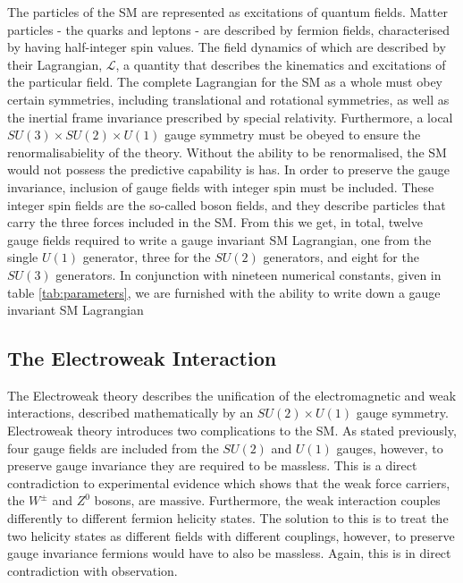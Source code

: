 The particles of the SM are represented as excitations of quantum fields.
Matter particles - the quarks and leptons - are described by fermion fields, characterised by having half-integer spin values.
The field dynamics of which are described by their Lagrangian, $\mathcal{L}$, a quantity that describes the kinematics and excitations of the particular field. 
The complete Lagrangian for the SM as a whole must obey certain symmetries, including translational and rotational symmetries, as well as the inertial frame invariance prescribed by special relativity.
Furthermore, a local $SU(3) \times SU(2) \times U(1)$ gauge symmetry must be obeyed to ensure the renormalisabielity of the theory. 
Without the ability to be renormalised, the SM would not possess the predictive capability is has.
In order to preserve the gauge invariance, inclusion of gauge fields with integer spin must be included.
These integer spin fields are the so-called boson fields, and they describe particles that carry the three forces included in the SM.
From this we get, in total, twelve gauge fields required to write a gauge invariant SM Lagrangian, one from the single $U(1)$ generator, three for the $SU(2)$ generators, and eight for the $SU(3)$ generators.
In conjunction with nineteen numerical constants, given in table \ref{tab:parameters}, we are furnished with the ability to write down a gauge invariant SM Lagrangian

\subsection{The Electroweak Interaction}
\label{subsec:EWInteraction}
The Electroweak theory \cite{glashow1959renormalizability} describes the unification of the electromagnetic and weak interactions, described mathematically by an $SU(2) \times U(1)$ gauge symmetry.
Electroweak theory introduces two complications to the SM.
As stated previously, four gauge fields are included from the $SU(2)$ and $U(1)$ gauges, however, to preserve gauge invariance they are required to be massless.
This is a direct contradiction to experimental evidence which shows that the weak force carriers, the $W^{\pm}$ and $Z^{0}$ bosons, are massive.
Furthermore, the weak interaction couples differently to different fermion helicity states.
The solution to this is to treat the two helicity states as different fields with different couplings, however, to preserve gauge invariance fermions would have to also be massless.
Again, this is in direct contradiction with observation.

